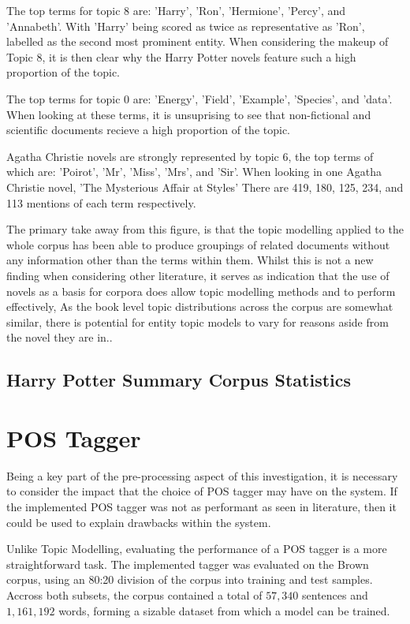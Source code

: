 \documentclass[10pt]{report}
\begin{document}
The top terms for topic 8 are: 'Harry', 'Ron', 'Hermione', 'Percy', and 'Annabeth'. With 'Harry' being scored as twice as representative as 'Ron', labelled as the second most prominent entity. When considering the makeup of Topic 8, it is then clear why the Harry Potter novels feature such a high proportion of the topic.

The top terms for topic 0 are: 'Energy', 'Field', 'Example', 'Species', and 'data'. When looking at these terms, it is unsuprising to see that non-fictional and scientific documents recieve a high proportion of the topic.

Agatha Christie novels are strongly represented by topic 6, the top terms of which are: 'Poirot', 'Mr', 'Miss', 'Mrs', and 'Sir'. When looking in one Agatha Christie novel, 'The Mysterious Affair at Styles' There are 419, 180, 125, 234, and 113 mentions of each term respectively.

The primary take away from this figure, is that the topic modelling applied to the whole corpus has been able to produce groupings of related documents without any information other than the terms within them. Whilst this is not a new finding when considering other literature, it serves as indication that the use of novels as a basis for corpora does allow topic modelling methods and to perform effectively, As the book level topic distributions across the corpus are somewhat similar, there is potential for entity topic models to vary for reasons aside from the novel they are in..

\subsection{Harry Potter Summary Corpus Statistics}



\clearpage
\section{POS Tagger}
Being a key part of the pre-processing aspect of this investigation, it is necessary to consider the impact that the choice of POS tagger may have on the system. If the implemented POS tagger was not as performant as seen in literature, then it could be used to explain drawbacks within the system.

Unlike Topic Modelling, evaluating the performance of a POS tagger is a more straightforward task. The implemented tagger was evaluated on the Brown corpus, using an 80:20 division of the corpus into training and test samples. Accross both subsets, the corpus contained a total of $57,340$ sentences and $1,161,192$ words, forming a sizable dataset from which a model can be trained.
\end{document}
